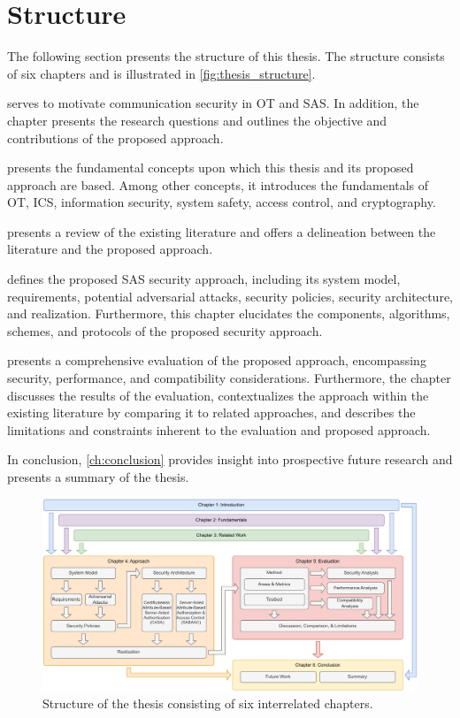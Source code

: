 \section{Structure}
\label{sec:introduction:structure}
The following section presents the structure of this thesis.
The structure consists of six chapters and is illustrated in \autoref{fig:thesis_structure}.

 serves to motivate communication security in OT and SAS.
In addition, the chapter presents the research questions and outlines the objective and contributions of the proposed approach.

 presents the fundamental concepts upon which this thesis and its proposed approach are based.
Among other concepts, it introduces the fundamentals of OT, ICS, information security, system safety, access control, and cryptography.

 presents a review of the existing literature and offers a delineation between the literature and the proposed approach.

 defines the proposed SAS security approach, including its system model, requirements, potential adversarial attacks, security policies, security architecture, and realization.
Furthermore, this chapter elucidates the components, algorithms, schemes, and protocols of the proposed security approach.

 presents a comprehensive evaluation of the proposed approach, encompassing security, performance, and compatibility considerations.
Furthermore, the chapter discusses the results of the evaluation, contextualizes the approach within the existing literature by comparing it to related approaches, and describes the limitations and constraints inherent to the evaluation and proposed approach.

In conclusion, \cref{ch:conclusion} provides insight into prospective future research and presents a summary of the thesis.
\begin{figure}
    \centering
    \includegraphics[width=1.\linewidth]{figures/thesis_structure.drawio.pdf}
    \caption{Structure of the thesis consisting of six interrelated chapters.}
    \label{fig:thesis_structure}
\end{figure}
